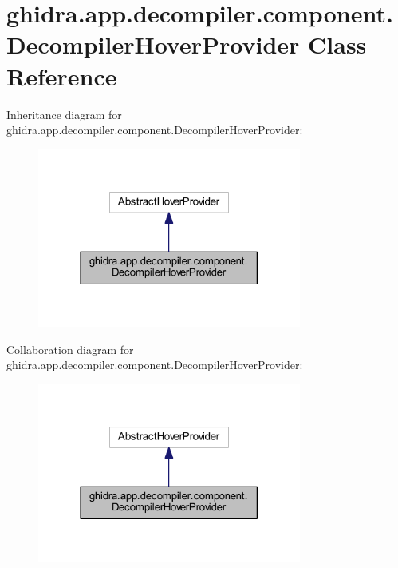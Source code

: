 \hypertarget{classghidra_1_1app_1_1decompiler_1_1component_1_1_decompiler_hover_provider}{}\section{ghidra.\+app.\+decompiler.\+component.\+Decompiler\+Hover\+Provider Class Reference}
\label{classghidra_1_1app_1_1decompiler_1_1component_1_1_decompiler_hover_provider}


Inheritance diagram for ghidra.\+app.\+decompiler.\+component.\+Decompiler\+Hover\+Provider\+:
\nopagebreak
\begin{figure}[H]
\begin{center}
\leavevmode
\includegraphics[width=246pt]{classghidra_1_1app_1_1decompiler_1_1component_1_1_decompiler_hover_provider__inherit__graph}
\end{center}
\end{figure}


Collaboration diagram for ghidra.\+app.\+decompiler.\+component.\+Decompiler\+Hover\+Provider\+:
\nopagebreak
\begin{figure}[H]
\begin{center}
\leavevmode
\includegraphics[width=246pt]{classghidra_1_1app_1_1decompiler_1_1component_1_1_decompiler_hover_provider__coll__graph}
\end{center}
\end{figure}
